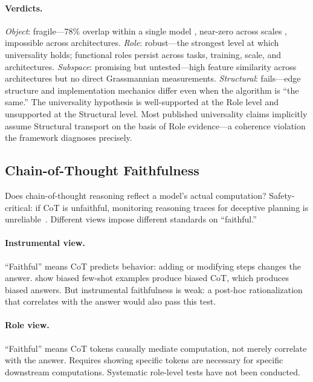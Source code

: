 \documentclass{article}
\begin{document}
\paragraph{Verdicts.}
\emph{Object}: fragile---78\% overlap within a single model
\citep{merullo2024}, near-zero across scales \citep{tigges2024},
impossible across architectures.
\emph{Role}: robust---the strongest level at which universality holds;
functional roles persist across tasks, training, scale, and
architectures.
\emph{Subspace}: promising but untested---high feature similarity across
architectures \citep{wang2024universality} but no direct Grassmannian
measurements.
\emph{Structural}: fails---edge structure and implementation mechanics
differ even when the algorithm is ``the same.''
The universality hypothesis is well-supported at the Role level and
unsupported at the Structural level. Most published universality claims
implicitly assume Structural transport on the basis of Role evidence---a
coherence violation the framework diagnoses precisely.


\subsection{Chain-of-Thought Faithfulness}\label{app:cs_cot}

Does chain-of-thought reasoning reflect a model's actual computation?
Safety-critical: if CoT is unfaithful, monitoring reasoning traces for
deceptive planning is unreliable~\citep{lanham2023measuring}. Different
views impose different standards on ``faithful.''

\paragraph{Instrumental view.}
``Faithful'' means CoT predicts behavior: adding or modifying steps
changes the answer. \citet{turpin2023} show biased few-shot examples
produce biased CoT, which produces biased answers. But instrumental
faithfulness is weak: a post-hoc rationalization that correlates with the
answer would also pass this test.

\paragraph{Role view.}
``Faithful'' means CoT tokens causally mediate computation, not merely
correlate with the answer. Requires showing specific tokens are necessary
for specific downstream computations. Systematic role-level tests have
not been conducted.
\end{document}
